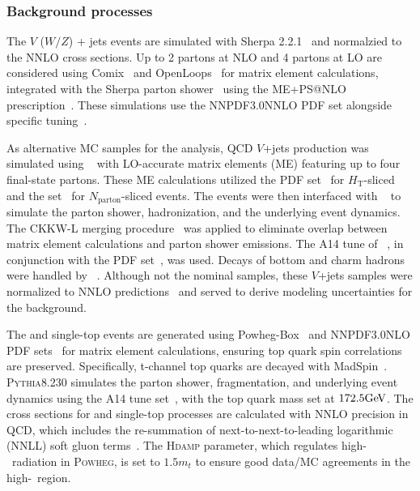 \subsubsection{Background processes}
\label{sec:bg_mc_sample}
The $V$ ($W/Z$) + jets events are simulated with Sherpa 2.2.1~\cite{Gleisberg:2008ta} and normalzied to the NNLO cross sections. 
Up to 2 partons at NLO and 4 partons at LO are considered using Comix~\cite{Gleisberg:2008fv} and OpenLoops~\cite{Cascioli:2011va} for matrix element calculations, integrated with the Sherpa parton shower~\cite{Schumann:2007mg} using the ME+PS@NLO prescription~\cite{Hoeche:2012yf}. 
These simulations use the NNPDF3.0NNLO PDF set alongside specific tuning~\cite{Ball_2015}. 

As alternative \Vjets MC samples for the analysis, QCD $V$+jets production was simulated using \MGNLO[2.2.2]~\cite{Alwall:2014hca} with LO-accurate matrix elements (ME) featuring up to four final-state partons. 
These ME calculations utilized the \NNPDF[3.0nlo] PDF set~\cite{Ball:2014uwa} for $H_\text{T}$-sliced and the \NNPDF[2.3lo] set~\cite{Ball:2012cx} for $N_\text{parton}$-sliced events. 
The events were then interfaced with \PYTHIA[8.186]~\cite{Sjostrand:2007gs} to simulate the parton shower, hadronization, and the underlying event dynamics.
The CKKW-L merging procedure~\cite{Lonnblad:2001iq,Lonnblad:2011xx} was applied to eliminate overlap between matrix element calculations and parton shower emissions.
The A14 tune of \PYTHIA[8]~\cite{ATL-PHYS-PUB-2014-021}, in conjunction with the \NNPDF[2.3lo] PDF set~\cite{Ball:2012cx}, was used. 
Decays of bottom and charm hadrons were handled by \EVTGEN[1.2.0]~\cite{Lange:2001uf}. 
Although not the nominal samples, these $V$+jets samples were normalized to NNLO predictions~\cite{Anastasiou:2003ds} and served to derive modeling uncertainties for the \Vjets background.

The \ttbar and single-top events are generated using Powheg-Box~\cite{Alioli:2010xd} and NNPDF3.0NLO PDF sets~\cite{Ball:2014uwa} for matrix element calculations, ensuring top quark spin correlations are preserved. 
Specifically, t-channel top quarks are decayed with MadSpin~\cite{Artoisenet:2012st}. 
\textsc{Pythia}8.230 simulates the parton shower, fragmentation, and underlying event dynamics using the A14 tune set~\cite{ATL-PHYS-PUB-2014-021}, with the top quark mass set at $172.5\text{Ge\kern -0.1em V}$. 
The cross sections for \ttbar and single-top processes are calculated with NNLO precision in QCD, which includes the re-summation of next-to-next-to-leading logarithmic (NNLL) soft gluon terms~\cite{Czakon:2011xx,Kidonakis:2011wy,Kidonakis:2010tc,Kidonakis:2010ux}.
The \textsc{Hdamp} parameter, which regulates high-\pt\ radiation in \textsc{Powheg}, is set to $1.5m_{t}$ to ensure good data/MC agreements in the high-\pt\ region\cite{ATL-PHYS-PUB-2016-020}.

